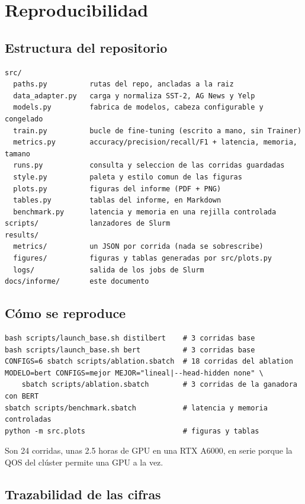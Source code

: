 \section{Reproducibilidad}
\label{sec:reproducibilidad}

\subsection{Estructura del repositorio}

\begin{lstlisting}
src/
  paths.py          rutas del repo, ancladas a la raiz
  data_adapter.py   carga y normaliza SST-2, AG News y Yelp
  models.py         fabrica de modelos, cabeza configurable y congelado
  train.py          bucle de fine-tuning (escrito a mano, sin Trainer)
  metrics.py        accuracy/precision/recall/F1 + latencia, memoria, tamano
  runs.py           consulta y seleccion de las corridas guardadas
  style.py          paleta y estilo comun de las figuras
  plots.py          figuras del informe (PDF + PNG)
  tables.py         tablas del informe, en Markdown
  benchmark.py      latencia y memoria en una rejilla controlada
scripts/            lanzadores de Slurm
results/
  metrics/          un JSON por corrida (nada se sobrescribe)
  figures/          figuras y tablas generadas por src/plots.py
  logs/             salida de los jobs de Slurm
docs/informe/       este documento
\end{lstlisting}

\subsection{Cómo se reproduce}

\begin{lstlisting}
bash scripts/launch_base.sh distilbert    # 3 corridas base
bash scripts/launch_base.sh bert          # 3 corridas base
CONFIGS=6 sbatch scripts/ablation.sbatch  # 18 corridas del ablation
MODELO=bert CONFIGS=mejor MEJOR="lineal|--head-hidden none" \
    sbatch scripts/ablation.sbatch        # 3 corridas de la ganadora con BERT
sbatch scripts/benchmark.sbatch           # latencia y memoria controladas
python -m src.plots                       # figuras y tablas
\end{lstlisting}

Son \num{24} corridas, unas \num{2,5} horas de GPU en una RTX A6000, en serie
porque la QOS del clúster permite una GPU a la vez.

\subsection{Trazabilidad de las cifras}

